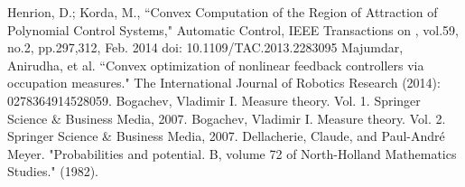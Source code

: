 \documentclass[dvipsnames]{article}
\begin{document}
\begin{thebibliography}{9}
  Henrion, D.; Korda, M., ``Convex Computation of the Region of Attraction of Polynomial Control Systems," Automatic Control, IEEE Transactions on , vol.59, no.2, pp.297,312, Feb. 2014
    doi: 10.1109/TAC.2013.2283095
Majumdar, Anirudha, et al. ``Convex optimization of nonlinear feedback controllers via occupation measures." The International Journal of Robotics Research (2014): 0278364914528059.
Bogachev, Vladimir I. Measure theory. Vol. 1. Springer Science \& Business Media, 2007.
Bogachev, Vladimir I. Measure theory. Vol. 2. Springer Science \& Business Media, 2007.
Dellacherie, Claude, and Paul-André Meyer. "Probabilities and potential. B, volume 72 of North-Holland Mathematics Studies." (1982).
\end{thebibliography}
\end{document}
